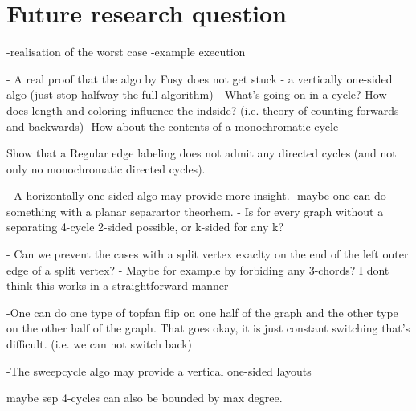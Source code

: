 \section{Future research question}
\thispagestyle{plain}

-realisation of the worst case
-example execution


- A real proof that the algo by Fusy does not get stuck
- a vertically one-sided algo (just stop halfway the full algorithm)
- What's going on in a cycle? How does length and coloring influence the indside? (i.e. theory of counting forwards and backwards)
  -How about the contents of a monochromatic cycle

Show that a Regular edge labeling does not admit any directed cycles (and not only no monochromatic directed cycles).

- A horizontally one-sided algo may provide more insight.
-maybe one can do something with a planar separartor theorhem.
- Is for every graph without a separating 4-cycle 2-sided possible, or k-sided for any k?

- Can we prevent the cases with a split vertex exaclty on the end of the left outer edge of a split vertex?
      - Maybe for example by forbiding any 3-chords? I dont think this works in a straightforward manner

-One can do one type of topfan flip on one half of the graph and the other type on the other half of the graph. That goes okay, it is just constant switching that's difficult. (i.e. we can not switch back)

-The sweepcycle algo may provide a vertical one-sided layouts


maybe sep 4-cycles can also be bounded by max degree.
